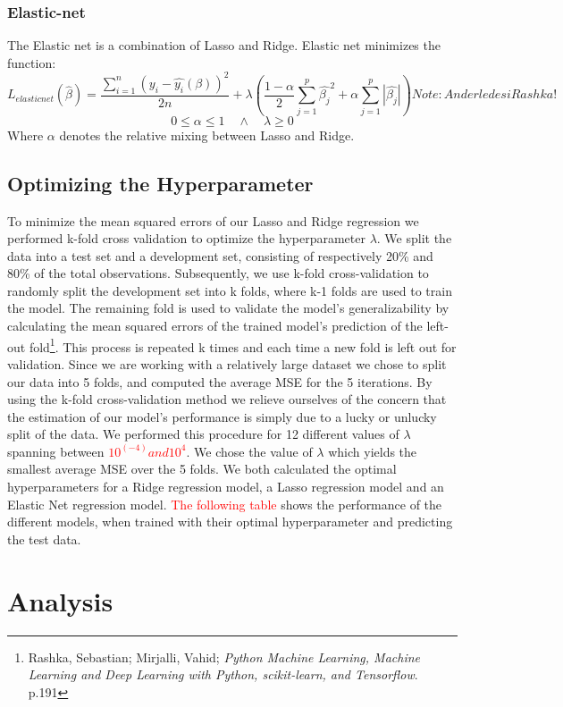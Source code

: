 \documentclass[12pt,a4paper]{article}
\begin{document}
\subsubsection{Elastic-net}
The Elastic net is a combination of Lasso and Ridge. Elastic net minimizes the function: 
$$L_{elasticnet}(\hat{\beta}) = \frac{\sum_{i=1}^{n}\left(y_i-\hat{y_i}(\beta)\right)^2}{2n} + \lambda\left(\frac{1-\alpha}{2}\sum_{j=1}^{p}\hat{\beta_j}^2+\alpha\sum_{j=1}^{p}|\hat{\beta_j}|\right) Note: Anderledes i Rashka!$$
$$0 \leq \alpha \leq 1 \quad \wedge \quad \lambda \geq 0$$
Where $\alpha$ denotes the relative mixing between Lasso and Ridge. 
\subsection{Optimizing the Hyperparameter}
To minimize the mean squared errors of our Lasso and Ridge regression we performed k-fold cross validation to optimize the hyperparameter $\lambda$. 
We split the data into a test set and a development set, consisting of respectively 20\% and 80\% of the total observations. Subsequently, we use k-fold cross-validation to randomly split the development set into k folds, where k-1 folds are used to train the model. The remaining fold is used to validate the model’s generalizability by calculating the mean squared errors of the trained model’s prediction of the left-out fold\footnote{Rashka, Sebastian; Mirjalli, Vahid; \textit{Python Machine Learning, Machine Learning and Deep Learning with Python, scikit-learn, and Tensorflow}. p.191}. This process is repeated k times and each time a new fold is left out for validation. Since we are working with a relatively large dataset we chose to split our data into 5 folds, and computed the average MSE for the 5 iterations. By using the k-fold cross-validation method we relieve ourselves of the concern that the estimation of our model’s performance is simply due to a lucky or unlucky split of the data. \newline
We performed this procedure for 12 different values of $\lambda$ spanning between \textcolor{red}{$10^(-4) and 10^4$}. We chose the value of $\lambda$ which yields the smallest average MSE over the 5 folds. 
We both calculated the optimal hyperparameters for a Ridge regression model, a Lasso regression model and an Elastic Net regression model. \textcolor{red}{The following table} shows the performance of the different models, when trained with their optimal hyperparameter and predicting the test data.

\section{Analysis}
\end{document}
